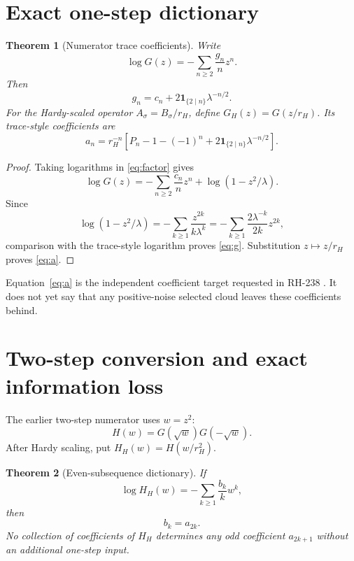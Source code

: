 \documentclass[11pt]{article}
\newtheorem{theorem}{Theorem}[section]
\theoremstyle{remark}
\begin{document}
\section{Exact one-step dictionary}

\begin{theorem}[Numerator trace coefficients]\label{thm:one-step}
Write
\[
 \log G(z)=-\sum_{n\ge2}\frac{g_n}{n}z^n.
\]
Then
\begin{equation}\label{eq:g}
 \boxed{
 g_n=c_n+2\mathbf{1}_{\{2\mid n\}}\lambda^{-n/2}.}
\end{equation}
For the Hardy-scaled operator $A_\sigma=B_\sigma/r_H$, define
$G_H(z)=G(z/r_H)$.  Its trace-style coefficients are
\begin{equation}\label{eq:a}
 \boxed{
 a_n=r_H^{-n}
 \left[P_n-1-(-1)^n+2\mathbf{1}_{\{2\mid n\}}\lambda^{-n/2}\right].}
\end{equation}
\end{theorem}

\begin{proof}
Taking logarithms in \eqref{eq:factor} gives
\[
 \log G(z)
 =-\sum_{n\ge2}\frac{c_n}{n}z^n+\log(1-z^2/\lambda).
\]
Since
\[
 \log(1-z^2/\lambda)
 =-\sum_{k\ge1}\frac{z^{2k}}{k\lambda^k}
 =-\sum_{k\ge1}\frac{2\lambda^{-k}}{2k}z^{2k},
\]
comparison with the trace-style logarithm proves \eqref{eq:g}.  Substitution
$z\mapsto z/r_H$ proves \eqref{eq:a}.
\end{proof}

Equation~\eqref{eq:a} is the independent coefficient target requested in
RH-238 \citep{WangRH238}.  It does not yet say that any positive-noise selected cloud leaves
these coefficients behind.

\section{Two-step conversion and exact information loss}

The earlier two-step numerator uses $w=z^2$:
\begin{equation}\label{eq:H}
 H(w)=G(\sqrt w)G(-\sqrt w).
\end{equation}
After Hardy scaling, put $H_H(w)=H(w/r_H^2)$.

\begin{theorem}[Even-subsequence dictionary]\label{thm:two-step}
If
\[
 \log H_H(w)=-\sum_{k\ge1}\frac{b_k}{k}w^k,
\]
then
\begin{equation}\label{eq:b}
 \boxed{b_k=a_{2k}.}
\end{equation}
No collection of coefficients of $H_H$ determines any odd coefficient
$a_{2k+1}$ without an additional one-step input.
\end{theorem}
\end{document}
